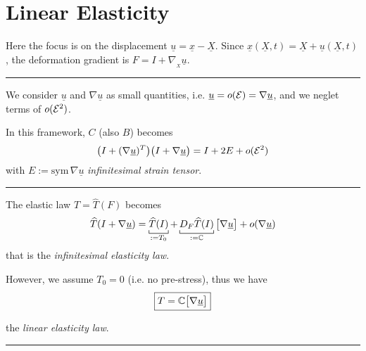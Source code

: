 

\section{\texorpdfstring{\color{red}Linear Elasticity}{}}


Here the focus is on the displacement $\underline{u}=\underline{x}-\underline{X}$. Since $\underline{x}(\underline{X},t)=\underline{X}+\underline{u}(\underline{X},t)$, the deformation gradient is $\boxed{F=I+\nabla_{\!\!_X} \underline{u}}$.  

\rule{0.31\textwidth}{0.2pt}
\smallskip

We consider $\underline{u}$ and $\nabla \underline{u}$ as small quantities, i.e. $\underline{u}=o(\mathcal{E})=\nabla\underline{u}$, and we neglet terms of $o(\mathcal{E}^2)$.

\smallskip

In this framework, $C$ (also $B$) becomes
\vspace{-0.2em}
\begin{equation*}
\big(I+(\nabla \underline{u})^T\big) \big(I+\nabla \underline{u}\big)=I+2E+o(\mathcal{E}^2)
\end{equation*}
with $E:=\text{sym}\,\nabla\underline{u}$ \emph{infinitesimal strain tensor}.

\rule{0.31\textwidth}{0.2pt}
\smallskip

The elastic law $T=\hat{T}(F)$ becomes
\begin{equation*}
\hat{T}(I+\nabla\underline{u})=\underbracket[0.5pt]{\hat{T}(I)}_{:=T_0}+\underbracket[0.5pt]{D_F\hat{T}(I)}_{:=\CC}\big[\nabla\underline{u}\big]+o(\nabla\underline{u}) 
\end{equation*}
that is the \emph{infinitesimal elasticity law}.

\smallskip

However, we assume $T_0=0$ (i.e. no pre-stress), thus we have
\begin{equation*}
\boxed{T=\mathbb{C}\big[\nabla\underline{u}\big]}
\end{equation*}

the \emph{linear elasticity law}.

\rule{0.31\textwidth}{0.2pt}
\smallskip

